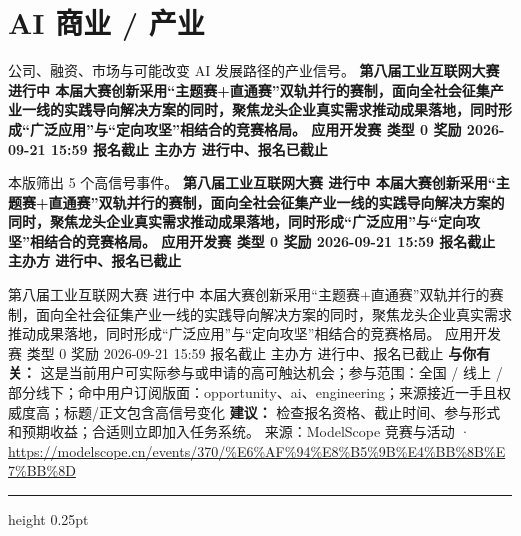 \documentclass[10.5pt]{ctexart}
\begin{document}
\section*{AI 商业 / 产业}
{\color{ormuted} 公司、融资、市场与可能改变 AI 发展路径的产业信号。}
\vspace{2mm}
{\LARGE\bfseries 第八届工业互联网大赛 进行中 本届大赛创新采用“主题赛+直通赛”双轨并行的赛制，面向全社会征集产业一线的实践导向解决方案的同时，聚焦龙头企业真实需求推动成果落地，同时形成“广泛应用”与“定向攻坚”相结合的竞赛格局。 应用开发赛 类型 0 奖励 2026-09-21 15:59 报名截止 主办方 进行中、报名已截止}\par
\vspace{1mm}
{\color{ormuted} 本版筛出 5 个高信号事件。}
\vspace{3mm}
{\Large\bfseries 第八届工业互联网大赛 进行中 本届大赛创新采用“主题赛+直通赛”双轨并行的赛制，面向全社会征集产业一线的实践导向解决方案的同时，聚焦龙头企业真实需求推动成果落地，同时形成“广泛应用”与“定向攻坚”相结合的竞赛格局。 应用开发赛 类型 0 奖励 2026-09-21 15:59 报名截止 主办方 进行中、报名已截止}\par
第八届工业互联网大赛 进行中 本届大赛创新采用“主题赛+直通赛”双轨并行的赛制，面向全社会征集产业一线的实践导向解决方案的同时，聚焦龙头企业真实需求推动成果落地，同时形成“广泛应用”与“定向攻坚”相结合的竞赛格局。 应用开发赛 类型 0 奖励 2026-09-21 15:59 报名截止 主办方 进行中、报名已截止
\textbf{与你有关：} 这是当前用户可实际参与或申请的高可触达机会；参与范围：全国 / 线上 / 部分线下；命中用户订阅版面：opportunity、ai、engineering；来源接近一手且权威度高；标题/正文包含高信号变化
\textbf{建议：} 检查报名资格、截止时间、参与形式和预期收益；合适则立即加入任务系统。
{\footnotesize\color{ormuted} 来源：ModelScope 竞赛与活动 · \url{https://modelscope.cn/events/370/%E6%AF%94%E8%B5%9B%E4%BB%8B%E7%BB%8D}}
\vspace{4mm}
\hrule height 0.25pt
\vspace{3mm}
\end{document}

